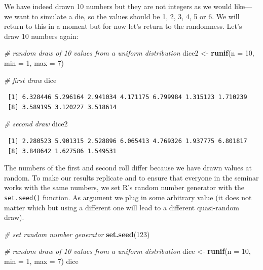 \documentclass[]{article}
\newenvironment{Shaded}{\begin{snugshade}}{\end{snugshade}}
\newcommand{\KeywordTok}[1]{\textcolor[rgb]{0.13,0.29,0.53}{\textbf{#1}}}
\newcommand{\DataTypeTok}[1]{\textcolor[rgb]{0.13,0.29,0.53}{#1}}
\newcommand{\DecValTok}[1]{\textcolor[rgb]{0.00,0.00,0.81}{#1}}
\newcommand{\StringTok}[1]{\textcolor[rgb]{0.31,0.60,0.02}{#1}}
\newcommand{\CommentTok}[1]{\textcolor[rgb]{0.56,0.35,0.01}{\textit{#1}}}
\newcommand{\NormalTok}[1]{#1}
\theoremstyle{definition}
\theoremstyle{definition}
\theoremstyle{definition}
\theoremstyle{remark}
\begin{document}
We have indeed drawn 10 numbers but they are not integers as we would
like---we want to simulate a die, so the values should be 1, 2, 3, 4, 5
or 6. We will return to this in a moment but for now let's return to the
randomness. Let's draw 10 numbers again:

\begin{Shaded}
\begin{Highlighting}[]
\CommentTok{# random draw of 10 values from a uniform distribution}
\NormalTok{dice2 <-}\StringTok{ }\KeywordTok{runif}\NormalTok{(}\DataTypeTok{n =} \DecValTok{10}\NormalTok{, }\DataTypeTok{min =} \DecValTok{1}\NormalTok{, }\DataTypeTok{max =} \DecValTok{7}\NormalTok{)}

\CommentTok{# first draw}
\NormalTok{dice}
\end{Highlighting}
\end{Shaded}

\begin{verbatim}
 [1] 6.328446 5.296164 2.941034 4.171175 6.799984 1.315123 1.710239
 [8] 3.589195 3.120227 3.518614
\end{verbatim}

\begin{Shaded}
\begin{Highlighting}[]
\CommentTok{# second draw}
\NormalTok{dice2}
\end{Highlighting}
\end{Shaded}

\begin{verbatim}
 [1] 2.280523 5.901315 2.528896 6.065413 4.769326 1.937775 6.801817
 [8] 3.848642 1.627586 1.549531
\end{verbatim}

The numbers of the first and second roll differ because we have drawn
values at random. To make our results replicate and to ensure that
everyone in the seminar works with the same numbers, we set R's random
number generator with the \texttt{set.seed()} function. As argument we
plug in some arbitrary value (it does not matter which but using a
different one will lead to a different quasi-random draw).

\begin{Shaded}
\begin{Highlighting}[]
\CommentTok{# set random number generator}
\KeywordTok{set.seed}\NormalTok{(}\DecValTok{123}\NormalTok{)}

\CommentTok{# random draw of 10 values from a uniform distribution}
\NormalTok{dice <-}\StringTok{ }\KeywordTok{runif}\NormalTok{(}\DataTypeTok{n =} \DecValTok{10}\NormalTok{, }\DataTypeTok{min =} \DecValTok{1}\NormalTok{, }\DataTypeTok{max =} \DecValTok{7}\NormalTok{)}
\NormalTok{dice}
\end{Highlighting}
\end{Shaded}
\end{document}
